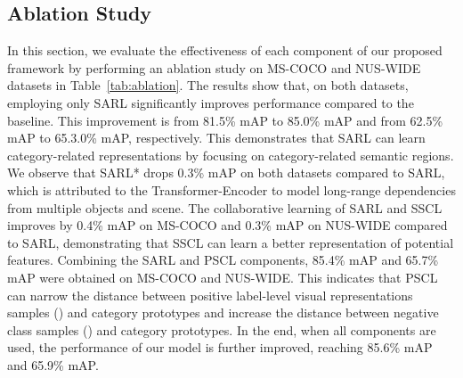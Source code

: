 \documentclass{ecai}
\begin{document}
\subsection{Ablation Study}
In this section, we evaluate the effectiveness of each component of our proposed framework by performing an ablation study on MS-COCO and NUS-WIDE datasets in Table~\ref{tab:ablation}.
The results show that, on both datasets, employing only SARL significantly improves performance compared to the baseline. This improvement is from 81.5\% mAP to 85.0\% mAP and from 62.5\% mAP to 65.3.0\% mAP, respectively.
This demonstrates that SARL can learn category-related representations by focusing on category-related semantic regions.
We observe that SARL* drops 0.3\% mAP on both datasets compared to SARL, which is attributed to the Transformer-Encoder to model long-range dependencies from multiple objects and scene.
The collaborative learning of SARL and SSCL improves by 0.4\% mAP on MS-COCO and 0.3\% mAP on NUS-WIDE compared to SARL, demonstrating that SSCL can learn a better representation of potential features.
Combining the SARL and PSCL components, 85.4\% mAP and 65.7\% mAP were obtained on MS-COCO and NUS-WIDE. This indicates that PSCL can narrow the distance between positive label-level visual representations samples () and category prototypes and increase the distance between negative class samples () and category prototypes. In the end, when all components are used, the performance of our model is further improved, reaching 85.6\% mAP and 65.9\% mAP.
\end{document}
